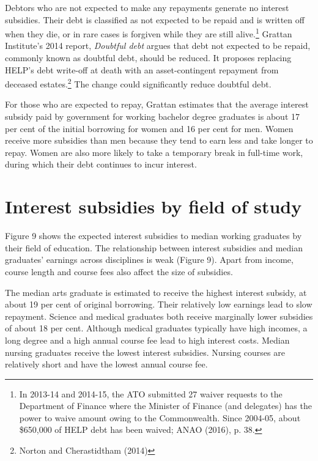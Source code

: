 \documentclass[embargoed]{grattan}
\begin{document}
Debtors who are not expected to make any repayments generate no interest subsidies. Their debt is classified as not expected to be repaid and is written off when they die, or in rare cases is forgiven while they are still alive.\footnote{In 2013-14 and 2014-15, the ATO submitted 27 waiver requests to the Department of Finance where the Minister of Finance (and delegates) has the power to waive amount owing to the Commonwealth. Since 2004-05, about \$650,000 of HELP debt has been waived; ANAO (2016), p. 38.} Grattan Institute's 2014 report, \emph{Doubtful debt} argues that debt not expected to be repaid, commonly known as doubtful debt, should be reduced. It proposes replacing HELP's debt write-off at death with an asset-contingent repayment from deceased estates.\footnote{Norton and Cherastidtham (2014)} The change could significantly reduce doubtful debt.

For those who are expected to repay, Grattan estimates that the average interest subsidy paid by government for working bachelor degree graduates is about 17 per cent of the initial borrowing for women and 16 per cent for men. Women receive more subsidies than men because they tend to earn less and take longer to repay. Women are also more likely to take a temporary break in full-time work, during which their debt continues to incur interest.

\section{Interest subsidies by field of study}\label{interest-subsidies-by-field-of-study}

Figure 9 shows the expected interest subsidies to median working graduates by their field of education. The relationship between interest subsidies and median graduates' earnings across disciplines is weak (Figure 9). Apart from income, course length and course fees also affect the size of subsidies.

The median arts graduate is estimated to receive the highest interest subsidy, at about 19 per cent of original borrowing. Their relatively low earnings lead to slow repayment. Science and medical graduates both receive marginally lower subsidies of about 18 per cent. Although medical graduates typically have high incomes, a long degree and a high annual course fee lead to high interest costs. Median nursing graduates receive the lowest interest subsidies. Nursing courses are relatively short and have the lowest annual course fee.
\end{document}
